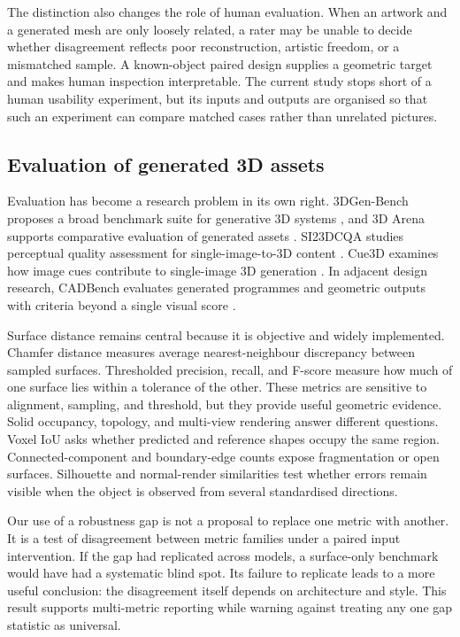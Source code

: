 \documentclass[12pt,a4paper]{article}
\begin{document}
The distinction also changes the role of human evaluation. When an artwork and a generated mesh are only loosely related, a rater may be unable to decide whether disagreement reflects poor reconstruction, artistic freedom, or a mismatched sample. A known-object paired design supplies a geometric target and makes human inspection interpretable. The current study stops short of a human usability experiment, but its inputs and outputs are organised so that such an experiment can compare matched cases rather than unrelated pictures.

\subsection{Evaluation of generated 3D assets}

Evaluation has become a research problem in its own right. 3DGen-Bench proposes a broad benchmark suite for generative 3D systems \parencite{jiang2025threedgenbench}, and 3D Arena supports comparative evaluation of generated assets \parencite{ebert2025threedarena}. SI23DCQA studies perceptual quality assessment for single-image-to-3D content \parencite{fu2025si23dcqa}. Cue3D examines how image cues contribute to single-image 3D generation \parencite{li2025cue3d}. In adjacent design research, CADBench evaluates generated programmes and geometric outputs with criteria beyond a single visual score \parencite{doris2026cadbench}.

Surface distance remains central because it is objective and widely implemented. Chamfer distance measures average nearest-neighbour discrepancy between sampled surfaces. Thresholded precision, recall, and F-score measure how much of one surface lies within a tolerance of the other. These metrics are sensitive to alignment, sampling, and threshold, but they provide useful geometric evidence. Solid occupancy, topology, and multi-view rendering answer different questions. Voxel IoU asks whether predicted and reference shapes occupy the same region. Connected-component and boundary-edge counts expose fragmentation or open surfaces. Silhouette and normal-render similarities test whether errors remain visible when the object is observed from several standardised directions.

Our use of a robustness gap is not a proposal to replace one metric with another. It is a test of disagreement between metric families under a paired input intervention. If the gap had replicated across models, a surface-only benchmark would have had a systematic blind spot. Its failure to replicate leads to a more useful conclusion: the disagreement itself depends on architecture and style. This result supports multi-metric reporting while warning against treating any one gap statistic as universal.
\end{document}
